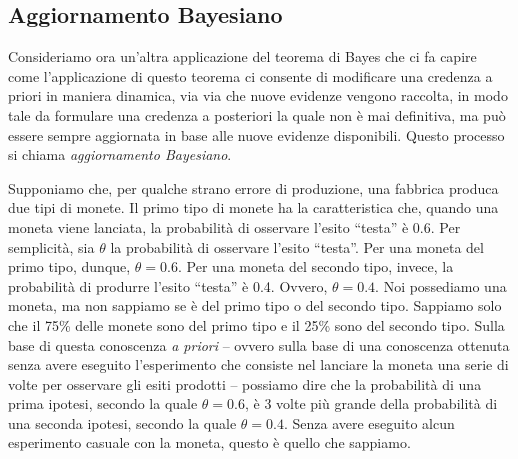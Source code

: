 %
%


\subsection{Aggiornamento Bayesiano}

Consideriamo ora un'altra applicazione del teorema di Bayes che ci fa capire come l'applicazione di questo teorema ci consente di modificare una credenza a priori in maniera dinamica, via via che nuove evidenze vengono raccolta, in modo tale da formulare una credenza a posteriori la quale non è mai definitiva, ma può essere sempre aggiornata in base alle nuove evidenze disponibili.
Questo processo si chiama \emph{aggiornamento Bayesiano}.

Supponiamo che, per qualche strano errore di produzione, una fabbrica produca due tipi di monete.
Il primo tipo di monete ha la caratteristica che, quando una moneta viene lanciata, la probabilità di osservare l'esito \enquote{testa} è 0.6.
Per semplicità, sia $\theta$ la probabilità di osservare l'esito \enquote{testa}.
Per una moneta del primo tipo, dunque, $\theta = 0.6$.
Per una moneta del secondo tipo, invece, la probabilità di produrre l'esito \enquote{testa} è 0.4. 
Ovvero, $\theta = 0.4$.
Noi possediamo una moneta, ma non sappiamo se è del primo tipo o del secondo tipo.
Sappiamo solo che il 75\% delle monete sono del primo tipo e il 25\% sono del secondo tipo.
Sulla base di questa conoscenza \emph{a priori} -- ovvero sulla base di una conoscenza ottenuta senza avere eseguito l'esperimento che consiste nel lanciare la moneta una serie di volte per osservare gli esiti prodotti -- possiamo dire che la probabilità di una prima ipotesi, secondo la quale $\theta = 0.6$, è 3 volte più grande della probabilità di una seconda ipotesi, secondo la quale $\theta = 0.4$.
Senza avere eseguito alcun esperimento casuale con la moneta, questo è quello che sappiamo.

